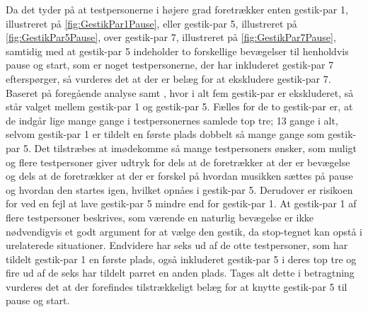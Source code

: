 Da det tyder på at testpersonerne i højere grad foretrækker enten gestik-par 1, illustreret på \autoref{fig:GestikPar1Pause}, eller gestik-par 5, illustreret på \autoref{fig:GestikPar5Pause}, over gestik-par 7, illustreret på \autoref{fig:GestikPar7Pause}, samtidig med at gestik-par 5 indeholder to forskellige bevægelser til henholdvis pause og start, som er noget testpersonerne, der har inkluderet gestik-par 7 efterspørger, så vurderes det at der er belæg for at ekskludere gestik-par 7. \blankline
%
Baseret på foregående analyse samt , hvor i alt fem gestik-par er ekskluderet, så står valget mellem gestik-par 1 og gestik-par 5. Fælles for de to gestik-par er, at de indgår lige mange gange i testpersonernes samlede top tre; 13 gange i alt, selvom gestik-par 1 er tildelt en første plads dobbelt så mange gange som gestik-par 5. Det tilstræbes at imødekomme så mange testpersoners ønsker, som muligt og flere testpersoner giver udtryk for dels at de foretrækker at der er bevægelse og dels at de foretrækker at der er forskel på hvordan musikken sættes på pause og hvordan den startes igen, hvilket opnåes i gestik-par 5. Derudover er risikoen for ved en fejl at lave gestik-par 5 mindre end for gestik-par 1. At gestik-par 1 af flere testpersoner beskrives, som værende en naturlig bevægelse er ikke nødvendigvis et godt argument for at vælge den gestik, da stop-tegnet kan opstå i urelaterede situationer. Endvidere har seks ud af de otte testpersoner, som har tildelt gestik-par 1 en første plads, også inkluderet gestik-par 5 i deres top tre og fire ud af de seks har tildelt parret en anden plads. Tages alt dette i betragtning vurderes det at der forefindes tilstrækkeligt belæg for at knytte gestik-par 5 til pause og start.            





